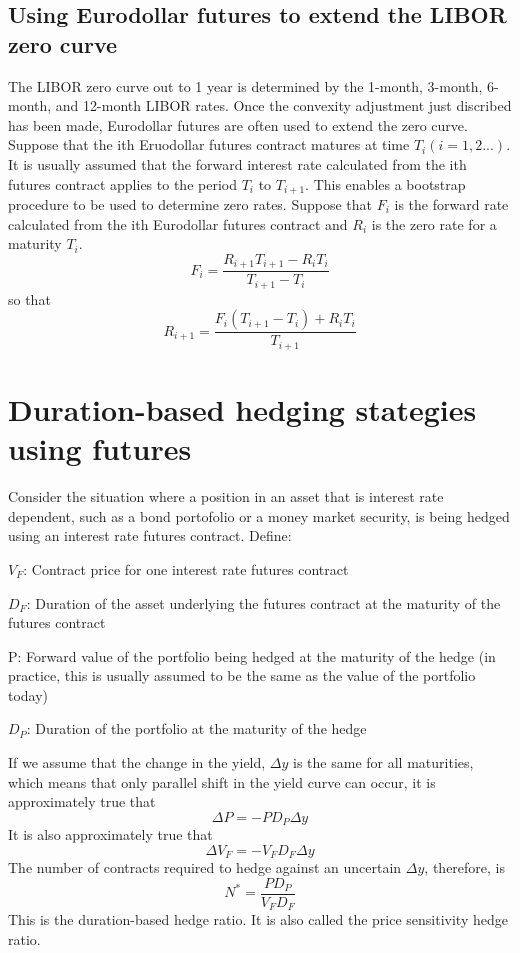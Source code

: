 \documentclass{article}
\begin{document}
\subsection{Using Eurodollar futures to extend the LIBOR zero curve}
The LIBOR zero curve out to 1 year is determined by the 1-month, 3-month, 6-month, and 12-month LIBOR rates. Once the convexity adjustment just discribed has been made, Eurodollar futures are often used to extend the zero curve. Suppose that the ith Eruodollar futures contract matures at time $ T_i(i=1,2...) $. It is usually assumed that the forward interest rate calculated from the ith futures contract applies to the period $ T_i $ to $ T_{i+1} $. This enables a bootstrap procedure to be used to determine zero rates. Suppose that $ F_i $ is the forward rate calculated from the ith Eurodollar futures contract and $ R_i $ is the zero rate for a maturity $ T_i $.
\[
F_i=\frac{R_{i+1}T_{i+1}-R_iT_i}{T_{i+1}-T_i}
\]
so that
\begin{equation}
	R_{i+1}=\frac{F_i(T_{i+1}-T_i)+R_iT_i}{T_{i+1}}
\end{equation}

\section{Duration-based hedging stategies using futures}
Consider the situation where a position in an asset that is interest rate dependent, such as a bond portofolio or a money market security, is being hedged using an interest rate futures contract. Define:

$ V_F $: Contract price for one interest rate futures contract

$ D_F $: Duration of the asset underlying the futures contract at the maturity of the futures contract

P: Forward value of the portfolio being hedged at the maturity of the hedge (in practice, this is usually assumed to be the same as the value of the portfolio today)

$ D_P $: Duration of the portfolio at the maturity of the hedge

If we assume that the change in the yield, $ \Delta y $ is the same for all maturities, which means that only parallel shift in the yield curve can occur, it is approximately true that
\[
	\Delta P=-PD_P\Delta y
\]
It is also approximately true that
\[
	\Delta V_F=-V_FD_F\Delta y
\]
The number of contracts required to hedge against an uncertain $ \Delta y $, therefore, is
\begin{equation}
	N^*=\frac{PD_P}{V_FD_F}
\end{equation}
This is the duration-based hedge ratio. It is also called the price sensitivity hedge ratio.
\end{document}
